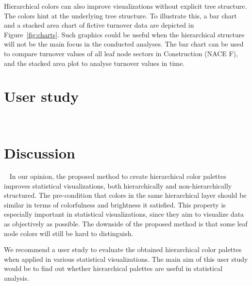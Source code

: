 \documentclass[journal]{vgtc}                %
\begin{document}
Hierarchical colors can also improve visualizations without explicit tree structure. The colors hint at the underlying tree structure.
To illustrate this, a bar chart and a stacked area chart of fictive turnover data are depicted in Figure~\ref{fig:charts}. Such graphics could be useful when the hierarchical structure will not be the main focus in the conducted analyses. The bar chart can be used to compare turnover values of all leaf node sectors in Construction (NACE F), and the stacked area plot to analyse turnover values in time.





\section{User study}~\label{secuser}


\section{Discussion}~\label{secdisc}
In our opinion, the proposed method to create hierarchical color palettes improves statistical visualizations, both hierarchically and non-hierarchically structured. The pre-condition that colors in the same hierarchical layer should be similar in terms of colorfulness and brightness it satisfied. This property is especially important in statistical visualizations, since they aim to visualize data as objectively as possible. The downside of the proposed method is that some leaf node colors will still be hard to distinguish.

We recommend a user study to evaluate the obtained hierarchical color palettes when applied in various statistical visualizations. The main aim of this user study would be to find out whether hierarchical palettes are useful in statistical analysis.





\end{document}

